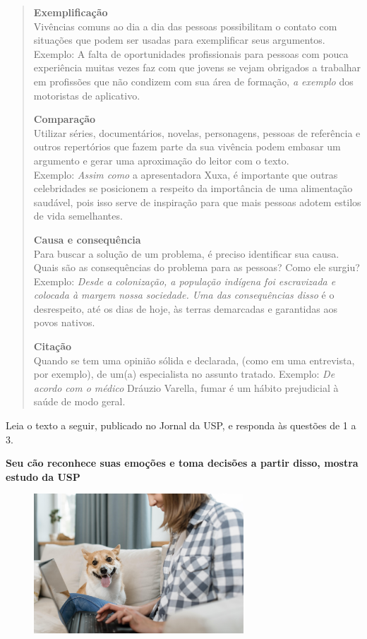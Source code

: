 {\begin{quote}
\noindent\textbf{Exemplificação}\\
Vivências comuns ao dia a dia das pessoas possibilitam o contato com
situações que podem ser usadas para exemplificar seus argumentos.
Exemplo: A falta de oportunidades profissionais para pessoas com pouca
experiência muitas vezes faz com que jovens se vejam obrigados a
trabalhar em profissões que não condizem com sua área de formação,
\emph{a exemplo} dos motoristas de aplicativo.

\noindent\textbf{Comparação}\\
Utilizar séries, documentários, novelas, personagens, pessoas de
referência e outros repertórios que fazem parte da sua vivência podem
embasar um argumento e gerar uma aproximação do leitor com o texto.\\
Exemplo: \emph{Assim como} a apresentadora Xuxa, é importante que outras
celebridades se posicionem a respeito da importância de uma alimentação
saudável, pois isso serve de inspiração para que mais pessoas adotem
estilos de vida semelhantes.

\noindent\textbf{Causa e consequência}\\
Para buscar a solução de um problema, é preciso identificar sua causa.
Quais são as consequências do problema para as pessoas? Como ele surgiu?
Exemplo: \emph{Desde a colonização, a população indígena foi escravizada
e colocada à margem nossa sociedade. Uma das consequências disso} é o
desrespeito, até os dias de hoje, às terras demarcadas e garantidas aos
povos nativos.

\noindent\textbf{Citação}\\
Quando se tem uma opinião sólida e declarada, (como em uma entrevista,
por exemplo), de um(a) especialista no assunto tratado. Exemplo:
\emph{De acordo com o médico} Dráuzio Varella, fumar é um hábito
prejudicial à saúde de modo geral.
\end{quote}
}

Leia o texto a seguir, publicado no Jornal da USP, e responda às
questões de 1 a 3.

\noindent\textbf{Seu cão reconhece suas emoções e toma decisões a partir disso,
mostra estudo da USP}

\begin{figure}
\includegraphics[width=0.7\textwidth]{./imgSAEB_6_POR/freepik/PORT_6_IMG-8.jpeg}
\end{figure}

